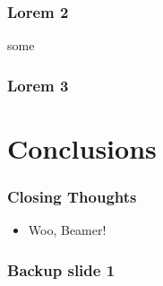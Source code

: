 \documentclass{beamer}
\begin{document}
		\begin{frame}
			\frametitle{Lorem 2}
			some
		\end{frame}

		\begin{frame}
			\frametitle{Lorem 3}
			\blindtext
		\end{frame}

	\section{Conclusions}
		\begin{frame}
			\frametitle{Closing Thoughts}
			\begin{itemize}
				\item Woo, Beamer!
			\end{itemize}
		\end{frame}
	
	\appendix
	\backupbegin
	  \begin{frame}
	    \frametitle{Backup slide 1}
	    \blindtext
	  \end{frame}
	\backupend
\end{document}
